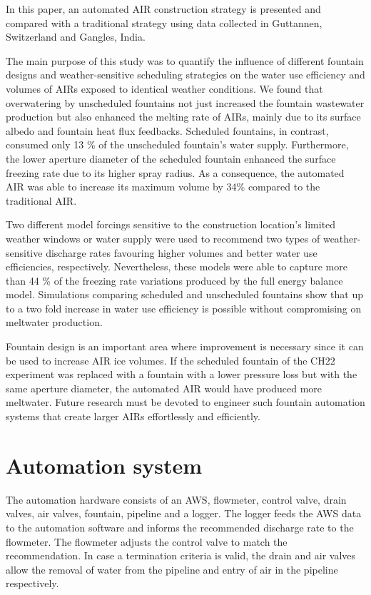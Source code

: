 \documentclass[tc, manuscript]{copernicus}
\begin{document}
\conclusions

In this paper, an automated AIR construction strategy is presented and compared with a traditional strategy
using data collected in Guttannen, Switzerland and Gangles, India.

The main purpose of this study was to quantify the influence of different fountain designs and weather-sensitive
scheduling strategies on the water use efficiency and volumes of AIRs exposed to identical weather conditions.
We found that overwatering by unscheduled fountains not just increased the fountain wastewater production but
also enhanced the melting rate of AIRs, mainly due to its surface albedo and fountain heat flux feedbacks.
Scheduled fountains, in contrast, consumed only 13 \% of the unscheduled fountain's water supply.  Furthermore,
the lower aperture diameter of the scheduled fountain enhanced the surface freezing rate due to its higher spray
radius. As a consequence, the automated AIR was able to increase its maximum volume by 34\% compared to the
traditional AIR.

Two different model forcings sensitive to the construction location's limited weather windows or water supply
were used to recommend two types of weather-sensitive discharge rates favouring higher volumes and better water
use efficiencies, respectively. Nevertheless, these models were able to capture more than 44 \% of the freezing
rate variations produced by the full energy balance model. Simulations comparing scheduled and unscheduled
fountains show that up to a two fold increase in water use efficiency is possible without compromising on
meltwater production.

Fountain design is an important area where improvement is necessary since it can be used to increase AIR ice
volumes. If the scheduled fountain of the CH22 experiment was replaced with a fountain with a lower pressure
loss but with the same aperture diameter, the automated AIR would have produced more meltwater. Future research
must be devoted to engineer such fountain automation systems that create larger AIRs effortlessly and
efficiently.

\appendix


\section{Automation system} \label{sec:auto_system}

The automation hardware consists of an AWS, flowmeter, control valve, drain valves, air valves, fountain,
pipeline and a logger. The logger feeds the AWS data to the automation software and informs the recommended
discharge rate to the flowmeter. The flowmeter adjusts the control valve to match the recommendation. In case a
termination criteria is valid, the drain and air valves allow the removal of water from the pipeline and entry
of air in the pipeline respectively.
\end{document}
